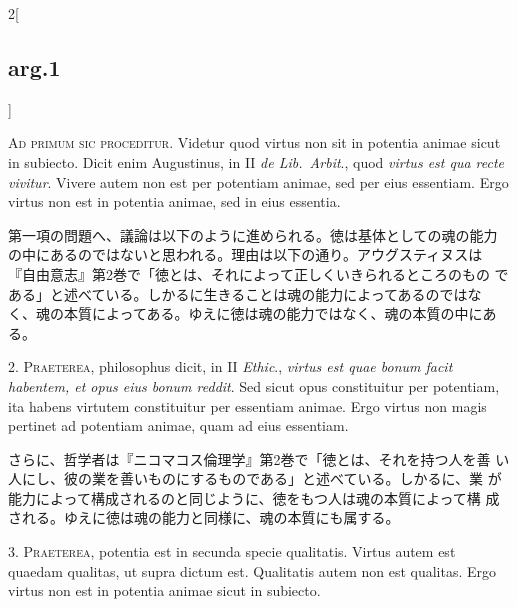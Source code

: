 \documentclass[paper=a4paper,fontsize=10pt,jafontsize=9pt,titlepage]{jlreq}
\begin{document}
\begin{paracol}{2}[\subsection{arg.1}]

{\scshape Ad primum sic proceditur}. Videtur quod virtus non sit in
potentia animae sicut in subiecto. Dicit enim Augustinus, in II
{\itshape de Lib.~Arbit}., quod {\itshape virtus est qua recte
vivitur}. Vivere autem non est per potentiam animae, sed per eius
essentiam. Ergo virtus non est in potentia animae, sed in eius
essentia.

\switchcolumn

第一項の問題へ、議論は以下のように進められる。徳は基体としての魂の能力
の中にあるのではないと思われる。理由は以下の通り。アウグスティヌスは
『自由意志』第2巻で「徳とは、それによって正しくいきられるところのもの
である」と述べている。しかるに生きることは魂の能力によってあるのではな
く、魂の本質によってある。ゆえに徳は魂の能力ではなく、魂の本質の中にあ
る。


2. {\scshape Praeterea}, philosophus dicit, in II {\itshape Ethic}.,
{\itshape virtus est quae bonum facit habentem, et opus eius bonum
reddit}. Sed sicut opus constituitur per potentiam, ita habens
virtutem constituitur per essentiam animae. Ergo virtus non magis
pertinet ad potentiam animae, quam ad eius essentiam.

\switchcolumn

さらに、哲学者は『ニコマコス倫理学』第2巻で「徳とは、それを持つ人を善
い人にし、彼の業を善いものにするものである」と述べている。しかるに、業
が能力によって構成されるのと同じように、徳をもつ人は魂の本質によって構
成される。ゆえに徳は魂の能力と同様に、魂の本質にも属する。


3. {\scshape Praeterea}, potentia est in secunda specie
qualitatis. Virtus autem est quaedam qualitas, ut supra dictum
est. Qualitatis autem non est qualitas. Ergo virtus non est in
potentia animae sicut in subiecto.

\switchcolumn


\end{paracol}
\end{document}
